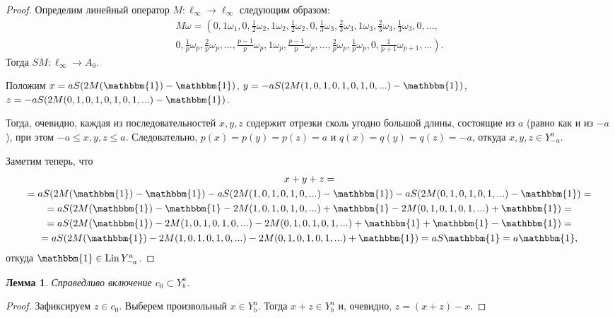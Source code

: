 \documentclass[a4paper,14pt]{article} %
\theoremstyle{plain}
\newtheorem{lemma}{Лемма}[section]
\begin{document}
\begin{proof}
	Определим линейный оператор $M:\ell_\infty \to \ell_\infty$ следующим образом:
	\begin{multline}
		M\omega=\left(
			0, 1\omega_1,
			0, \frac{1}{2}\omega_2, 1\omega_2, \frac{1}{2}\omega_2,
			0, \frac{1}{3}\omega_3, \frac{2}{3}\omega_3, 1\omega_3, \frac{2}{3}\omega_3, \frac{1}{3}\omega_3,
			0, ...,
		\right. \\ \left.
			0, \frac{1}{p}\omega_p, \frac{2}{p}\omega_p, ..., \frac{p-1}{p}\omega_p, 1\omega_p,
				\frac{p-1}{p}\omega_p, ..., \frac{2}{p}\omega_p, \frac{1}{p}\omega_p,
			0, \frac{1}{p+1}\omega_{p+1}, ...
		\right)
		.
	\end{multline}
	Тогда $SM: \ell_\infty \to A_0$.

	Положим $x=aS(2M(\mathbbm{1})-\mathbbm{1})$,
	$y=-aS(2M(1,0,1,0,1,0,1,0,...)-\mathbbm{1})$,
	$z=-aS(2M(0,1,0,1,0,1,0,1,...)-\mathbbm{1})$.

	Тогда, очевидно, каждая из последовательностей $x,y,z$ содержит отрезки сколь угодно большой длины,
	состоящие из $a$ (равно как и из $-a$), при этом $-a \leq x,y,z \leq a$.
	Следовательно, $p(x)=p(y)=p(z) = a$ и $q(x)=q(y)=q(z) = -a$,
	откуда $x,y,z \in Y^a_{-a}$.

	Заметим теперь, что
	\begin{multline}
		x + y + z
		=
		\\=
		aS(2M(\mathbbm{1})-\mathbbm{1}) - aS(2M(1,0,1,0,1,0,...)-\mathbbm{1}) - aS(2M(0,1,0,1,0,1,...)-\mathbbm{1})
		=
		\\=
		aS(2M(\mathbbm{1})-\mathbbm{1}  -    2M(1,0,1,0,1,0,...)+\mathbbm{1}  -    2M(0,1,0,1,0,1,...)+\mathbbm{1})
		=
		\\=
		aS(2M(\mathbbm{1}) - 2M(1,0,1,0,1,0,...) - 2M(0,1,0,1,0,1,...)+\mathbbm{1}+\mathbbm{1}-\mathbbm{1})
		=
		\\=
		aS(2M(\mathbbm{1}) - 2M(1,0,1,0,1,0,...) - 2M(0,1,0,1,0,1,...)+\mathbbm{1})
		=
		aS\mathbbm{1}
		=
		a\mathbbm{1}
		,
	\end{multline}
	откуда $\mathbbm{1} \in \operatorname{Lin} Y^a_{-a}$.
\end{proof}


\begin{lemma}
	\label{lem:c_0_Lin_alpha_0}
	Справедливо включение $c_0 \subset Y^a_b$.
\end{lemma}

\begin{proof}
	Зафиксируем $z\in c_0$.
	Выберем произвольный $x \in Y^a_b$.
	Тогда $x+z\in Y^a_b$ и, очевидно, $z=(x+z)-x$.
\end{proof}
\end{document}
